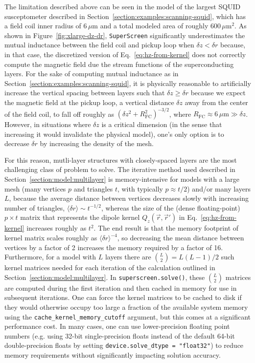 \documentclass[final,3p,times,twocolumn]{elsarticle}
\newcommand{\inline}[1]{\texttt{#1}\xspace}
\newcommand{\SuperScreen}{\inline{SuperScreen}}
\newcommand{\um}{\mu\mathrm{m}}
\begin{document}
The limitation described above can be seen in the model of the largest SQUID susceptometer described in Section~\ref{section:examples:scanning-squid}, which has a field coil inner radius of $6\,\um$ and a total modeled area of roughly $600\,\um^2$. As shown in Figure~\ref{fig:xlarge-dz-dr}, \SuperScreen significantly underestimates the mutual inductance between the field coil and pickup loop when $\delta z <\delta r$ because, in that case, the discretized version of Eq.~\ref{eq:hz-from-kernel} does not correctly compute the magnetic field due the stream functions of the superconducting layers. For the sake of computing mutual inductance as in Section~\ref{section:examples:scanning-squid}, it is physically reasonable to artificially increase the vertical spacing between layers such that $\delta z\geq \delta r$ because we expect the magnetic field at the pickup loop, a vertical distance $\delta z$ away from the center of the field coil, to fall off roughly as $\left(\delta z^2 + R^2_\mathrm{FC}\right)^{-3/2}$, where $R_\mathrm{FC}\approx 6\,\um\gg\delta z$. However, in situations where $\delta z$ is a critical dimension (in the sense that increasing it would invalidate the physical model), one's only option is to decrease $\delta r$ by increasing the density of the mesh.

For this reason, mutli-layer structures with closely-spaced layers are the most challenging class of problem to solve. The iterative method used described in Section~\ref{section:model:multilayer} is memory-intensive for models with a large mesh (many vertices $p$ and triangles $t$, with typically $p\approx t / 2$) and/or many layers $L$, because the average distance between vertices decreases slowly with increasing number of triangles, $\langle\delta r\rangle\sim t^{-1/2}$, whereas the size of the (dense floating-point) $p\times t$ matrix that represents the dipole kernel $Q_z(\vec{r},\vec{r}')$ in Eq.~\ref{eq:hz-from-kernel} increases roughly as $t^2$. The end result is that the memory footprint of kernel matrix scales roughly as $\langle\delta r\rangle^{-4}$, so decreasing the mean distance between vertices by a factor of 2 increases the memory required by a factor of 16. Furthermore, for a model with $L$ layers there are $\binom{L}{2} = L(L-1)/2$ such kernel matrices needed for each iteration of the calculation outlined in Section~\ref{section:model:multilayer}. In \inline{superscreen.solve()}, these $\binom{L}{2}$ matrices are computed during the first iteration and then cached in memory for use in subsequent iterations. One can force the kernel matrices to be cached to disk if they would otherwise occupy too large a fraction of the available system memory using the \inline{cache_kernel_memory_cutoff} argument, but this comes at a significant performance cost. In many cases, one can use lower-precision floating point numbers (e.g. using 32-bit single-precision floats instead of the default 64-bit double-precision floats by setting \inline{device.solve_dtype = "float32"}) to reduce memory requirements without significantly impacting solution accuracy.
\end{document}
